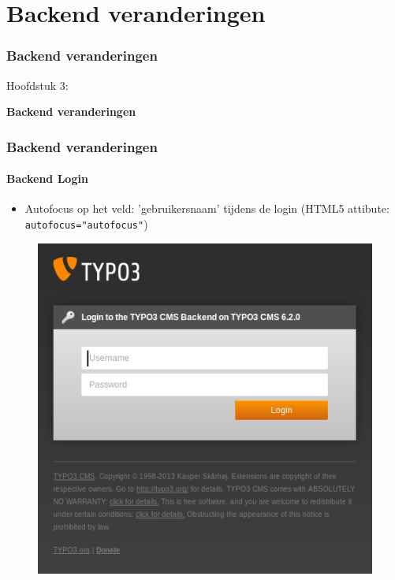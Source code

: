 %

\section{Backend veranderingen}
\begin{frame}[fragile]
	\frametitle{Backend veranderingen}

	\begin{center}\huge{Hoofdstuk 3:}\end{center}
	\begin{center}\huge{\color{typo3darkgrey}\textbf{Backend veranderingen}}\end{center}

\end{frame}


\begin{frame}[fragile]
	\frametitle{Backend veranderingen}
	\framesubtitle{Backend Login}

 	\begin{itemize}
		\item Autofocus op het veld: 'gebruikersnaam' tijdens de login\newline
			(HTML5 attibute: \texttt{autofocus="autofocus"})
	\end{itemize}

	\begin{figure}
		\includegraphics[width=0.4\linewidth]{Images/BackendChanges/BackendLogin.png}
	\end{figure}

\end{frame}

